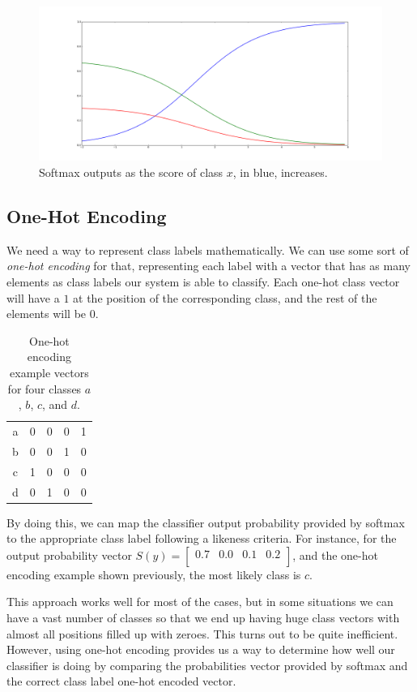 \documentclass[english, 11pt]{article}
\begin{document}
	\begin{figure}[!hbt]
		\centering
		\includegraphics[width=0.8\linewidth]{l1/figures/softmax_output}
		\caption{Softmax outputs as the score of class $x$, in blue, increases.}
		\label{fig:softmax}
	\end{figure}

	\subsection{One-Hot Encoding}

	We need a way to represent class labels mathematically. We can use some sort of \emph{one-hot encoding} for that, representing each label with a vector that has as many elements as class labels our system is able to classify. Each one-hot class vector will have a $1$ at the position of the corresponding class, and the rest of the elements will be $0$.

	\begin{table}[!hbt]
		\centering
		\begin{tabular}{c|cccc}
			a & 0 & 0 & 0 & 1\\
			b & 0 & 0 & 1 & 0\\
			c & 1 & 0 & 0 & 0\\
			d & 0 & 1 & 0 & 0\\
		\end{tabular}
		\caption{One-hot encoding example vectors for four classes $a$, $b$, $c$, and $d$.}
	\end{table}

By doing this, we can map the classifier output probability provided by softmax to the appropriate class label following a likeness criteria. For instance, for the output probability vector $S(y)=\begin{bmatrix} 0.7 & 0.0 & 0.1 & 0.2\\ \end{bmatrix}$, and the one-hot encoding example shown previously, the most likely class is $c$.

	This approach works well for most of the cases, but in some situations we can have a vast number of classes so that we end up having huge class vectors with almost all positions filled up with zeroes. This turns out to be quite inefficient. However, using one-hot encoding provides us a way to determine how well our classifier is doing by comparing the probabilities vector provided by softmax and the correct class label one-hot encoded vector.
\end{document}

